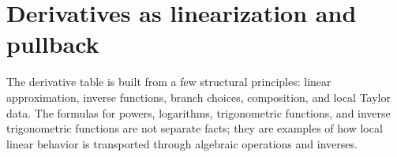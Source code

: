 \section{Derivatives as linearization and pullback}

The derivative table is built from a few structural principles: linear approximation, inverse functions, branch choices, composition, and local Taylor data.  The formulas for powers, logarithms, trigonometric functions, and inverse trigonometric functions are not separate facts; they are examples of how local linear behavior is transported through algebraic operations and inverses.
